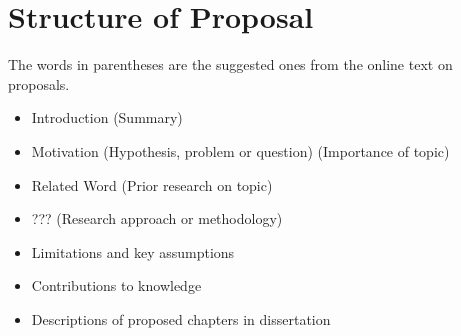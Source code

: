 \documentclass[a4paper,10pt,twoside]{article}
\begin{document}
\section{Structure of Proposal}

The words in parentheses are the suggested ones from the online text on proposals.

\begin{itemize}
\item Introduction (Summary)
\item Motivation (Hypothesis, problem or question) (Importance of topic)
\item Related Word (Prior research on topic)
\item ??? (Research approach or methodology)
\item Limitations and key assumptions
\item Contributions to knowledge
\item Descriptions of proposed chapters in dissertation
\end{itemize}

{\small %

}
\end{document}
